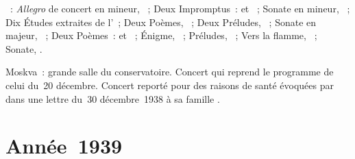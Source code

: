 \begin{description}
 \textsc{\Scriabine{}}~: \emph{Allegro} de concert en \kB \Flat mineur,
 ~; Deux Impromptus~:   et 
 ~; Sonate en \kF \Sharp mineur, ~; Dix Études extraites
 de l'~; Deux Poèmes, ~; Deux Préludes, ~; Sonate
 en \kF \Sharp majeur, ~; Deux Poèmes~:   et
  ~; Énigme,  ~; Préludes, ~;
 Vers la flamme, ~; Sonate, .
 \item[\DateWithWeekDay{1938-12-29}]
 Moskva~: grande salle du conservatoire.
 Concert qui reprend le programme de celui du~20 décembre.
 Concert reporté pour des raisons de santé évoquées par \VSofronitsky{} dans
 une lettre du~30 décembre~1938 à sa famille \citep[p.~25]{Kogan08}.
\end{description}

\section{Année~1939}


